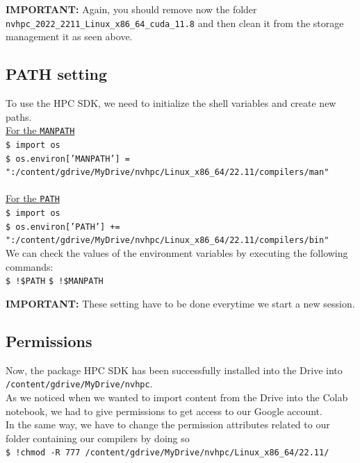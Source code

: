 \documentclass[10pt,a4paper]{article}
\newcommand{\code}[1]{\colorbox{light-gray}{\texttt{#1}}}
\begin{document}
\vspace{0.2cm}
\textbf{IMPORTANT:} Again, you should remove now the folder \code{nvhpc\_2022\_2211\_Linux\_x86\_64\_cuda\_11.8} and then clean it from the storage management it as seen above.\\

\subsection{PATH setting}
To use the HPC SDK, we need to initialize the shell variables and create new paths.\\
\underline{For the \code{MANPATH}}\\
\code{\$ import os}\\
\code{\$ os.environ['MANPATH'] = ":/content/gdrive/MyDrive/nvhpc/Linux\_x86\_64/22.11/compilers/man"}\\
\vspace{0.2cm}\\
\underline{For the \code{PATH}}\\
\code{\$ import os}\\
\code{\$ os.environ['PATH'] += ":/content/gdrive/MyDrive/nvhpc/Linux\_x86\_64/22.11/compilers/bin"}\\
We can check the values of the environment variables by executing the following commands:\\
\code{\$ !\$PATH}
\code{\$ !\$MANPATH}

\vspace{0.2cm}
\textbf{IMPORTANT:} These setting have to be done everytime we start a new session.\\

\subsection{Permissions}
Now, the package HPC SDK has been successfully installed into the Drive into \code{/content/gdrive/MyDrive/nvhpc}.\\
As we noticed when we wanted to import content from the Drive into the Colab notebook, we had to give permissions to get access to our Google account.\\
In the same way, we have to change the permission attributes related to our folder containing our compilers by doing so\\
\code{\$ !chmod -R 777 /content/gdrive/MyDrive/nvhpc/Linux\_x86\_64/22.11/}
\end{document}
